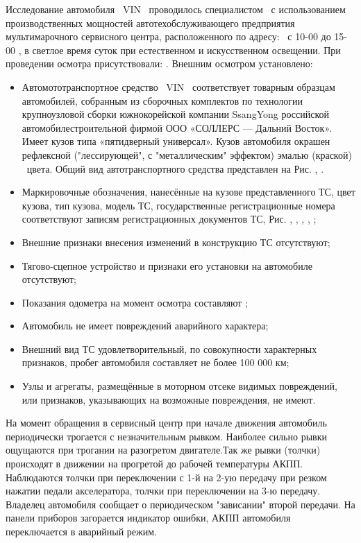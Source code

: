 Исследование автомобиля \, VIN  \vin\,  проводилось  специалистом \, с использованием производственных мощностей автотехобслуживающего предприятия мультимарочного сервисного центра, расположенного по адресу: \,  с 10-00 до 15-00 ,  в светлое время суток при естественном и искусственном освещении. При проведении осмотра присутствовали: .   Внешним осмотром установлено:\\
\begin{itemize}
\item 
Автомототранспортное средство \, VIN  \vin\, соответствует товарным образцам автомобилей, собранным из сборочных комплектов  по технологии крупноузловой сборки южнокорейской компании  SsangYong  российской автомобилестроительной фирмой ООО «СОЛЛЕРС — Дальний Восток».  Имеет кузов типа «пятидверный универсал».  Кузов автомобиля окрашен рефлексной ("лессирующей", с "металлическим" эффектом) эмалью (краской) \colr\, цвета. Общий вид автотранспортного средства представлен на Рис. ,  . 
\item 
Маркировочные обозначения, нанесённые на кузове представленного ТС, цвет кузова, тип кузова, модель ТС, государственные регистрационные номера соответствуют записям  регистрационных документов ТС, Рис. , , , , ;
\item 
Внешние признаки внесения изменений в конструкцию ТС отсутствуют;
\item 
Тягово-сцепное устройство и признаки его установки на автомобиле отсутствуют;
\item  
Показания одометра на момент осмотра составляют ;
\item 
Автомобиль не имеет   повреждений аварийного характера;
\item 
Внешний вид ТС удовлетворительный, по совокупности характерных признаков, пробег автомобиля составляет не более 100 000 км;
\item 
Узлы и агрегаты, размещённые в моторном отсеке видимых повреждений, или признаков, указывающих на возможные повреждения, не имеют.
\end{itemize}

На момент обращения в сервисный центр  при начале движения автомобиль периодически трогается с незначительным рывком. Наиболее сильно рывки ощущаются при трогании на разогретом двигателе.Так же рывки (толчки) происходят в движении на прогретой до рабочей температуры АКПП. Наблюдаются толчки при переключении с 1-й на 2-ую передачу при резком нажатии педали акселератора, толчки при переключении на 3-ю передачу. Владелец автомобиля сообщает о периодическом "зависании" второй передачи. На панели приборов загорается индикатор ошибки, АКПП автомобиля \,  переключается в аварийный режим. 


